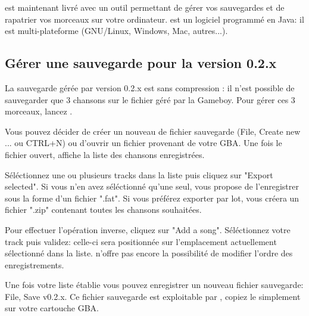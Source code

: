 \documentclass[12pt,a4paper]{article}
\begin{document}
  \FAT est maintenant livré avec un outil permettant de gérer vos sauvegardes et de rapatrier vos morceaux sur votre ordinateur. \BURGER est un logiciel programmé en Java: il est multi-plateforme (GNU/Linux, Windows, Mac, autres...).
  
    \subsection{Gérer une sauvegarde pour la version 0.2.x}
    
    La sauvegarde gérée par \FAT version 0.2.x est sans compression : il n'est possible de sauvegarder que 3 chansons sur le fichier géré par la Gameboy. Pour gérer ces 3 morceaux, lancez \BURGER.
    
    
    Vous pouvez décider de créer un nouveau de fichier sauvegarde (File, Create new ... ou CTRL+N)  ou d'ouvrir un fichier provenant de votre GBA. Une fois le fichier ouvert, \BURGER affiche la liste des chansons enregistrées.
    
    
    Séléctionnez une ou plusieurs tracks dans la liste puis cliquez sur "Export selected". Si vous n'en avez séléctionné qu'une seul, \BURGER vous propose de l'enregistrer sous la forme d'un fichier ".fat". Si vous préférez exporter par lot, \BURGER vous créera un fichier ".zip" contenant toutes les chansons souhaitées.\medskip
    
    Pour effectuer l'opération inverse, cliquez sur "Add a song". Séléctionnez votre track puis validez: celle-ci sera positionnée sur l'emplacement actuellement sélectionné dans la liste. \BURGER n'offre pas encore la possibilité de modifier l'ordre des enregistrements.\medskip
    
    Une fois votre liste établie vous pouvez enregistrer un nouveau fichier sauvegarde: File, Save v0.2.x. Ce fichier sauvegarde est exploitable par \FAT, copiez le simplement sur votre cartouche GBA.
  
\end{document}
